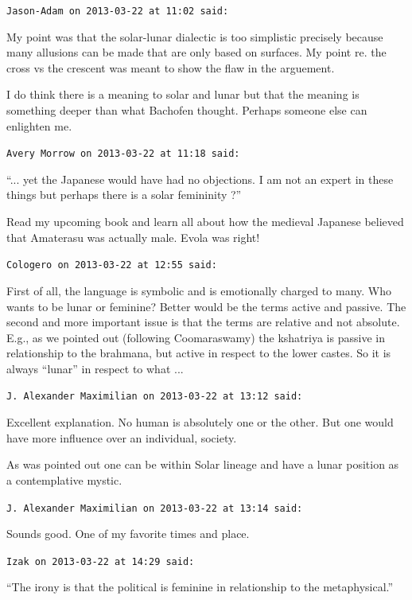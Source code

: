 \begin{footnotesize}
\begin{sffamily}
\hfill

\texttt{Jason-Adam on 2013-03-22 at 11:02 said:}

My point was that the solar-lunar dialectic is too simplistic precisely because many allusions can be made that are only based on surfaces. My point re. the cross vs the crescent was meant to show the flaw in the arguement.

I do think there is a meaning to solar and lunar but that the meaning is something deeper than what Bachofen thought. Perhaps someone else can enlighten me.

\hfill

\texttt{Avery Morrow on 2013-03-22 at 11:18 said:}

``... yet the Japanese would have had no objections. I am not an expert in these things but perhaps there is a solar femininity ?''

Read my upcoming book and learn all about how the medieval Japanese believed that Amaterasu was actually male. Evola was right!

\hfill

\texttt{Cologero on 2013-03-22 at 12:55 said:}

First of all, the language is symbolic and is emotionally charged to many. Who wants to be lunar or feminine? Better would be the terms active and passive. The second and more important issue is that the terms are relative and not absolute. E.g., as we pointed out (following Coomaraswamy) the kshatriya is passive in relationship to the brahmana, but active in respect to the lower castes. So it is always ``lunar'' in respect to what ... 

\hfill

\texttt{J. Alexander Maximilian on 2013-03-22 at 13:12 said:}

Excellent explanation. No human is absolutely one or the other. But one would have more influence over an individual, society.

As was pointed out one can be within Solar lineage and have a lunar position as a contemplative mystic.

\hfill

\texttt{J. Alexander Maximilian on 2013-03-22 at 13:14 said:}

Sounds good. One of my favorite times and place.

\hfill

\texttt{Izak on 2013-03-22 at 14:29 said:}

``The irony is that the political is feminine in relationship to the metaphysical.''


\end{sffamily}
\end{footnotesize}

